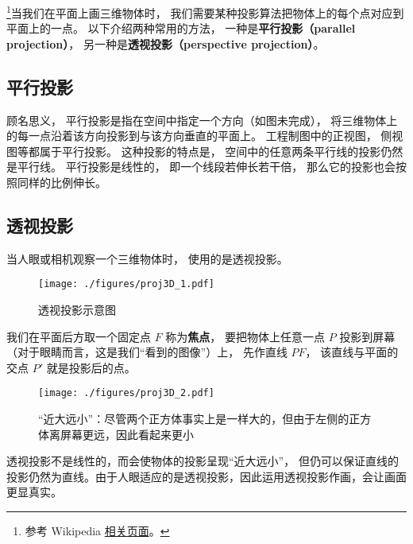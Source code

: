
\begin{issues}
\issueTODO
\end{issues}

\footnote{参考 Wikipedia \href{https://en.wikipedia.org/wiki/3D_projection}{相关页面}。}当我们在平面上画三维物体时， 我们需要某种投影算法把物体上的每个点对应到平面上的一点。 以下介绍两种常用的方法， 一种是\textbf{平行投影（parallel projection）}， 另一种是\textbf{透视投影（perspective projection）}。


\subsection{平行投影}
顾名思义， 平行投影是指在空间中指定一个方向（如图未完成）， 将三维物体上的每一点沿着该方向投影到与该方向垂直的平面上。 工程制图中的正视图， 侧视图等都属于平行投影。 这种投影的特点是， 空间中的任意两条平行线的投影仍然是平行线。 平行投影是线性的， 即一个线段若伸长若干倍， 那么它的投影也会按照同样的比例伸长。

\subsection{透视投影}
当人眼或相机观察一个三维物体时， 使用的是透视投影。
\begin{figure}[ht]
\centering
\texttt{[image: ./figures/proj3D\_1.pdf]}
\caption{透视投影示意图} \label{proj3D_fig1}
\end{figure}

我们在平面后方取一个固定点 $F$ 称为\textbf{焦点}， 要把物体上任意一点 $P$ 投影到屏幕（对于眼睛而言，这是我们“看到的图像”）上， 先作直线 $PF$， 该直线与平面的交点 $P'$ 就是投影后的点。 

\begin{figure}[ht]
\centering
\texttt{[image: ./figures/proj3D\_2.pdf]}
\caption{“近大远小”：尽管两个正方体事实上是一样大的，但由于左侧的正方体离屏幕更远，因此看起来更小} \label{proj3D_fig2}
\end{figure}

透视投影不是线性的，而会使物体的投影呈现“近大远小”， 但仍可以保证直线的投影仍然为直线。由于人眼适应的是透视投影，因此运用透视投影作画，会让画面更显真实。

